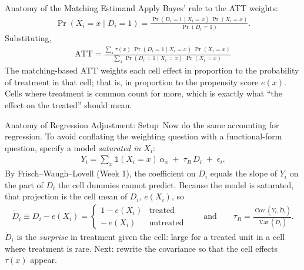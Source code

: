 \documentclass[aspectratio=169,11pt,xcolor=dvipsnames]{beamer}
\DeclareMathOperator{\Cov}{Cov}
\DeclareMathOperator{\Var}{Var}
\newcommand{\adv}{\,\raisebox{0.6pt}{\textcolor{accent}{$\bigstar$}}}
\begin{document}
\begin{frame}{Anatomy of the Matching Estimand}
Apply Bayes' rule to the ATT weights:
\begin{align*}
  \Pr(X_i = x \mid D_i = 1)
  = \frac{\Pr(D_i = 1\mid X_i = x)\,\Pr(X_i=x)}{\Pr(D_i=1)} .
\end{align*}
\pause
Substituting,
\begin{align*}
  \boxed{\;
  \text{ATT}
  = \frac{\sum_x \tau(x)\;\Pr(D_i=1\mid X_i=x)\;\Pr(X_i=x)}
         {\sum_x \Pr(D_i=1\mid X_i=x)\;\Pr(X_i=x)}\;}
\end{align*}
\vskip3pt
\alert{The matching-based ATT weights each cell effect in proportion to the
probability of treatment in that cell}; that is, in proportion to the
propensity score $e(x)$. Cells where treatment is common count for more, which
is exactly what ``the effect on the treated'' should mean.
\end{frame}

\begin{frame}{Anatomy of Regression Adjustment: Setup\adv}
Now do the same accounting for regression. To avoid conflating the weighting
question with a functional-form question, specify a model
\emph{saturated in $X_i$}:
\begin{align*}
  Y_i = \sum_x \mathds{1}(X_i = x)\,\alpha_x \;+\; \tau_R\, D_i \;+\; \epsilon_i .
\end{align*}
\vskip3pt
By Frisch--Waugh--Lovell (Week 1), the coefficient on $D_i$ equals the slope
of $Y_i$ on the part of $D_i$ the cell dummies cannot predict. Because the
model is saturated, that projection is the cell mean of $D_i$, $e(X_i)$, so
\begin{align*}
  \check D_i \equiv D_i - e(X_i)
  = \begin{cases} 1 - e(X_i) & \text{treated} \\ -\,e(X_i) & \text{untreated}\end{cases}
  \qquad\text{and}\qquad
  \tau_R = \frac{\Cov(Y_i,\check D_i)}{\Var(\check D_i)} .
\end{align*}
$\check D_i$ is the \emph{surprise} in treatment given the cell: large for a
treated unit in a cell where treatment is rare. Next: rewrite the covariance
so that the cell effects $\tau(x)$ appear.
\end{frame}
\end{document}
